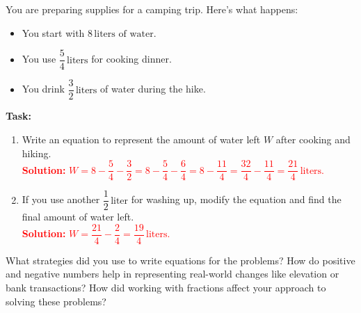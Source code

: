 \documentclass[11pt]{article}
\begin{document}
\vspace{1em}

\begin{tcolorbox}[colframe=black!60, colback=white, 
coltitle=black, colbacktitle=black!15, fonttitle=\bfseries\Large, 
title=Performance Task: Preparing for a Camping Trip, halign title=center, left=10pt, right=10pt, top=10pt, bottom=90pt]
You are preparing supplies for a camping trip. Here’s what happens:
\begin{itemize}
    \item You start with \( 8 \, \text{liters of water} \).
    \item You use \( \dfrac{5}{4} \, \text{liters} \) for cooking dinner.
    \item You drink \( \dfrac{3}{2} \, \text{liters} \) of water during the hike.
\end{itemize}
\textbf{Task:}
\begin{enumerate}[itemsep=4em]
    \item Write an equation to represent the amount of water left \(W\) after cooking and hiking.\\
    \textcolor{red}{\textbf{Solution:} \( W = 8 - \dfrac{5}{4} - \dfrac{3}{2} = 8 - \dfrac{5}{4} - \dfrac{6}{4} = 8 - \dfrac{11}{4} = \dfrac{32}{4} - \dfrac{11}{4} = \dfrac{21}{4} \, \text{liters.} \)}

    \item If you use another \( \dfrac{1}{2} \, \text{liter} \) for washing up, modify the equation and find the final amount of water left.\\
    \textcolor{red}{\textbf{Solution:} \( W = \dfrac{21}{4} - \dfrac{2}{4} = \dfrac{19}{4} \, \text{liters.} \)}
\end{enumerate}
\end{tcolorbox}

\begin{tcolorbox}[colframe=black!60, colback=white, 
coltitle=black, colbacktitle=black!15, fonttitle=\bfseries\Large, 
title=Reflection, halign title=center, left=10pt, right=10pt, top=10pt, bottom=100pt]
What strategies did you use to write equations for the problems? How do positive and negative numbers help in representing real-world changes like elevation or bank transactions? How did working with fractions affect your approach to solving these problems?
\end{tcolorbox}
\end{document}
